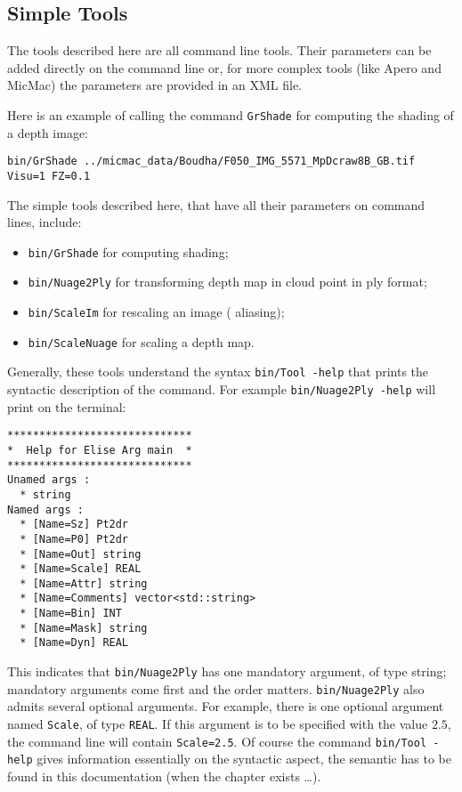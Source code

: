 \subsection{Simple Tools}

The tools described here are all command line tools. Their parameters can be added
directly on the command line or, for more complex tools (like Apero and MicMac) the
parameters are provided in an XML file.

Here is an example of calling the command {\tt GrShade} for computing the shading
of a depth image:

\begin{verbatim}
bin/GrShade ../micmac_data/Boudha/F050_IMG_5571_MpDcraw8B_GB.tif Visu=1 FZ=0.1
\end{verbatim}

The simple tools described here, that have all their parameters on command lines,
include:

\begin{itemize}
    \item {\tt bin/GrShade} for computing shading;
    \item {\tt bin/Nuage2Ply} for transforming depth map in cloud point in ply format;
    \item {\tt bin/ScaleIm} for rescaling an image ( aliasing); %
    \item {\tt bin/ScaleNuage} for scaling a depth map.
\end{itemize}

Generally, these tools understand the syntax {\tt bin/Tool -help} that prints the syntactic
description of the command. For example{ \tt bin/Nuage2Ply -help} will print on the terminal:

\begin{verbatim}
*****************************
*  Help for Elise Arg main  *
*****************************
Unamed args :
  * string
Named args :
  * [Name=Sz] Pt2dr
  * [Name=P0] Pt2dr
  * [Name=Out] string
  * [Name=Scale] REAL
  * [Name=Attr] string
  * [Name=Comments] vector<std::string>
  * [Name=Bin] INT
  * [Name=Mask] string
  * [Name=Dyn] REAL
\end{verbatim}


This indicates that {\tt bin/Nuage2Ply} has one mandatory argument, of type string;
mandatory arguments come first and the order matters. { \tt bin/Nuage2Ply}  also admits
several optional arguments. For example, there is one optional argument named  { \tt Scale},
of type  { \tt REAL}. If this argument is to be specified with the value $2.5$,  the command
line will contain {\tt Scale=2.5}.  Of course the command  {\tt bin/Tool -help} gives information
essentially on the syntactic aspect, the semantic has to be found in this documentation
(when the chapter exists \dots).

